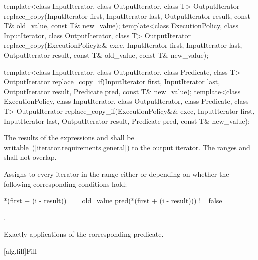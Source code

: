 %
%
\begin{itemdecl}
template<class InputIterator, class OutputIterator, class T>
  OutputIterator
    replace_copy(InputIterator first, InputIterator last,
                 OutputIterator result,
                 const T& old_value, const T& new_value);
template<class ExecutionPolicy, class InputIterator, class OutputIterator, class T>
  OutputIterator
    replace_copy(ExecutionPolicy&& exec,
                 InputIterator first, InputIterator last,
                 OutputIterator result,
                 const T& old_value, const T& new_value);

template<class InputIterator, class OutputIterator, class Predicate, class T>
  OutputIterator
    replace_copy_if(InputIterator first, InputIterator last,
                    OutputIterator result,
                    Predicate pred, const T& new_value);
template<class ExecutionPolicy, class InputIterator, class OutputIterator,
         class Predicate, class T>
  OutputIterator
    replace_copy_if(ExecutionPolicy&& exec,
                    InputIterator first, InputIterator last,
                    OutputIterator result,
                    Predicate pred, const T& new_value);
\end{itemdecl}

\begin{itemdescr}
\pnum
\requires
The results of the expressions
and
shall be writable~(\ref{iterator.requirements.general}) to the
output iterator.
The ranges
and
shall not overlap.

\pnum
\effects
Assigns to every iterator
in the
range
either
or
depending on whether the following corresponding conditions hold:

\begin{codeblock}
*(first + (i - result)) == old_value
pred(*(first + (i - result))) != false
\end{codeblock}

\pnum
\returns
{}.

\pnum
\complexity
Exactly
applications of the corresponding predicate.
\end{itemdescr}

[alg.fill]{Fill}

